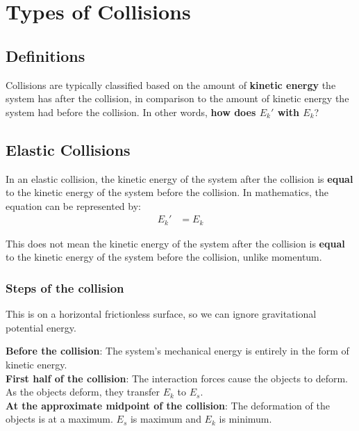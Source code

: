\newpage
\section{Types of Collisions}
\subsection{Definitions}
Collisions are typically classified based on the amount of \textbf{kinetic energy} the system has after the 
collision, in comparison to the amount of kinetic energy the system had before the collision. In other words,
\textbf{how does $E_k'$ with $E_{k}$}?

\subsection{Elastic Collisions}
In an elastic collision, the kinetic energy of the system after the collision is \textbf{equal} to the kinetic
energy of the system before the collision. In mathematics, the equation can be represented by:
\begin{align*}
    E_k' &= E_k
\end{align*}

\begin{remark}
    This does not mean the kinetic energy of the system after the collision is \textbf{equal} to the kinetic 
    energy of the system before the collision, unlike momentum.
\end{remark}

\subsubsection{Steps of the collision} 
\begin{remark}
    This is on a horizontal frictionless surface, so we can ignore gravitational potential energy.
\end{remark}
    \textbf{Before the collision}: The system's mechanical energy is entirely in the form of kinetic energy. \\

    \textbf{First half of the collision}: The interaction forces cause the objects to deform. As the objects deform, 
    they transfer $E_k$ to $E_s$.\\

    \textbf{At the approximate midpoint of the collision}: The deformation of the objects is at a maximum. $E_s$ is maximum and $E_k$ is minimum.\\

